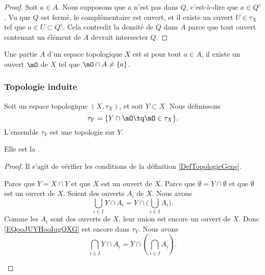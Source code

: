 \begin{proof}
	Soit \( a\in A\). Nous supposons que \( a\) n'est pas dans \( Q\), c'est-à-dire que \( a\in Q^c\). Vu que \( Q\) est fermé, le complémentaire est ouvert, et il existe un ouvert \( U\in\tau_X\) tel que \( a\in U\subset Q^c\). Cela contredit la densité de \( Q\) dans \( A\) parce que tout ouvert contenant un élément de \( A\) devrait intersecter \( Q\).
\end{proof}


\begin{definition}	\label{DEFooQUNJooWZasqV}
	Une partie \( A\) d'un espace topologique \( X\) est  si pour tout \( a\in A\), il existe un ouvert \( \mO\) de \( X\) tel que \( \mO\cap A\neq \{ a \}\).
\end{definition}


\subsubsection{Topologie induite}

\begin{propositionDef} \label{DefVLrgWDB}
	Soit un espace topologique \( (X, \tau_X) \), et soit \( Y \subset X \). Nous définissons
	\begin{equation}
		\tau_Y=\{ Y\cap\mO\tq \mO\in\tau_X \}.
	\end{equation}
	L'ensemble \( \tau_Y\) est une topologie sur \( Y\).

	Elle est la .
\end{propositionDef}

\begin{proof}
	Il s'agit de vérifier les conditions de la définition \ref{DefTopologieGene}.

	\begin{subproof}
		\spitem[\( Y\in \tau_Y\)]
		Parce que \( Y=X\cap Y\) et que \( X\) est un ouvert de \( X\).
		Parce que \( \emptyset = Y\cap\emptyset\) et que \( \emptyset\) est un ouvert de \( X\).
		Soient des ouverts \( A_i\) de \( X\). Nous avons
		\begin{equation}        \label{EQooJUYHooIugQXG}
			\bigcup_{i\in I}Y\cap A_i=Y\cap\big( \bigcup_{i\in I}A_i \big).
		\end{equation}
		Comme les \( A_i\) sont des ouverts de \( X\), leur union est encore un ouvert de \( X\). Donc \eqref{EQooJUYHooIugQXG} est encore dans \( \tau_Y\).
		Nous avons
		\begin{equation}
			\bigcap_{i\in I}Y\cap A_i=Y\cap\left( \bigcap_{i\in I}A_i \right).
		\end{equation}
	\end{subproof}
\end{proof}


